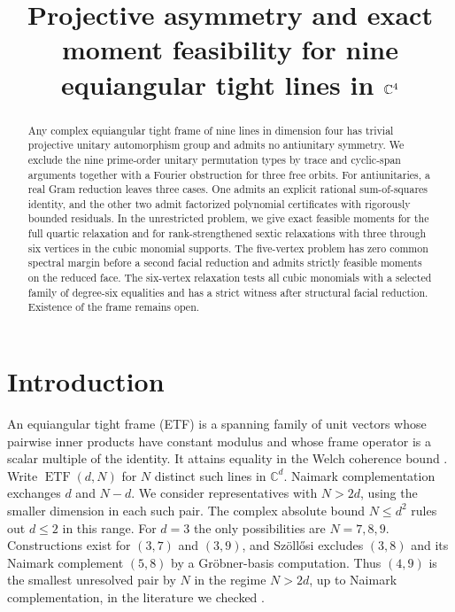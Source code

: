 \documentclass[11pt]{article}
\title{Projective asymmetry and exact moment feasibility for nine equiangular tight lines in $\C^4$}
\author{}
\date{}
\newcommand{\C}{\mathbb C}
\begin{document}
\maketitle

\begin{abstract}
Any complex equiangular tight frame of nine lines in dimension four has trivial projective unitary automorphism group and admits no antiunitary symmetry. We exclude the nine prime-order unitary permutation types by trace and cyclic-span arguments together with a Fourier obstruction for three free orbits. For antiunitaries, a real Gram reduction leaves three cases. One admits an explicit rational sum-of-squares identity, and the other two admit factorized polynomial certificates with rigorously bounded residuals. In the unrestricted problem, we give exact feasible moments for the full quartic relaxation and for rank-strengthened sextic relaxations with three through six vertices in the cubic monomial supports. The five-vertex problem has zero common spectral margin before a second facial reduction and admits strictly feasible moments on the reduced face. The six-vertex relaxation tests all cubic monomials with a selected family of degree-six equalities and has a strict witness after structural facial reduction. Existence of the frame remains open.
\end{abstract}

\section{Introduction}

An equiangular tight frame (ETF) is a spanning family of unit vectors whose pairwise inner products have constant modulus and whose frame operator is a scalar multiple of the identity. It attains equality in the Welch coherence bound \cite{welch}. Write $\operatorname{ETF}(d,N)$ for $N$ distinct such lines in $\C^d$. Naimark complementation exchanges $d$ and $N-d$. We consider representatives with $N>2d$, using the smaller dimension in each such pair. The complex absolute bound $N\le d^2$ rules out $d\le2$ in this range. For $d=3$ the only possibilities are $N=7,8,9$. Constructions exist for $(3,7)$ and $(3,9)$, and Sz\"oll\H{o}si excludes $(3,8)$ and its Naimark complement $(5,8)$ by a Gr\"obner-basis computation. Thus $(4,9)$ is the smallest unresolved pair by $N$ in the regime $N>2d$, up to Naimark complementation, in the literature we checked \cite[pp.~3, 5 and Table~2]{fickusmixon}\cite[Proposition~4.2 and Theorem~4.3]{szollosi}.
\end{document}
